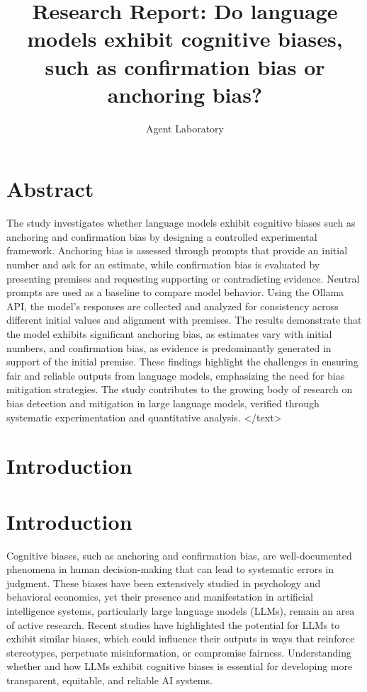 \documentclass{article}
\title{Research Report: Do language models exhibit cognitive biases, such as confirmation bias or anchoring bias?}
\author{Agent Laboratory}
\begin{document}
\maketitle
\section{Abstract}
The study investigates whether language models exhibit cognitive biases such as anchoring and confirmation bias by designing a controlled experimental framework. Anchoring bias is assessed through prompts that provide an initial number and ask for an estimate, while confirmation bias is evaluated by presenting premises and requesting supporting or contradicting evidence. Neutral prompts are used as a baseline to compare model behavior. Using the Ollama API, the model's responses are collected and analyzed for consistency across different initial values and alignment with premises. The results demonstrate that the model exhibits significant anchoring bias, as estimates vary with initial numbers, and confirmation bias, as evidence is predominantly generated in support of the initial premise. These findings highlight the challenges in ensuring fair and reliable outputs from language models, emphasizing the need for bias mitigation strategies. The study contributes to the growing body of research on bias detection and mitigation in large language models, verified through systematic experimentation and quantitative analysis.
</text>
\section{Introduction}
\section{Introduction}

Cognitive biases, such as anchoring and confirmation bias, are well-documented phenomena in human decision-making that can lead to systematic errors in judgment. These biases have been extensively studied in psychology and behavioral economics, yet their presence and manifestation in artificial intelligence systems, particularly large language models (LLMs), remain an area of active research. Recent studies have highlighted the potential for LLMs to exhibit similar biases, which could influence their outputs in ways that reinforce stereotypes, perpetuate misinformation, or compromise fairness. Understanding whether and how LLMs exhibit cognitive biases is essential for developing more transparent, equitable, and reliable AI systems.
\end{document}
